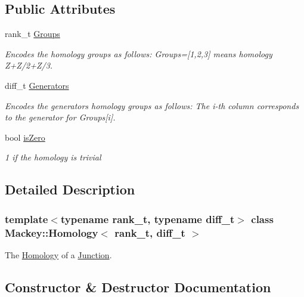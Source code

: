 \subsection*{Public Attributes}
\begin{DoxyCompactItemize}
\item 
rank\+\_\+t \hyperlink{classMackey_1_1Homology_aaae78e6463ce6e60e7f4c5861304bc5b}{Groups}
\begin{DoxyCompactList}\small\item\em Encodes the homology groups as follows\+: Groups=\mbox{[}1,2,3\mbox{]} means homology Z+\+Z/2+\+Z/3. \end{DoxyCompactList}\item 
diff\+\_\+t \hyperlink{classMackey_1_1Homology_afc375f3632f97e3fe3e24c06f1e18fa2}{Generators}
\begin{DoxyCompactList}\small\item\em Encodes the generators homology groups as follows\+: The i-\/th column corresponds to the generator for Groups\mbox{[}i\mbox{]}. \end{DoxyCompactList}\item 
bool \hyperlink{classMackey_1_1Homology_ae3bb3781bab2b5884295e04a8fddf36e}{is\+Zero}
\begin{DoxyCompactList}\small\item\em 1 if the homology is trivial \end{DoxyCompactList}\end{DoxyCompactItemize}


\subsection{Detailed Description}
\subsubsection*{template$<$typename rank\+\_\+t, typename diff\+\_\+t$>$\newline
class Mackey\+::\+Homology$<$ rank\+\_\+t, diff\+\_\+t $>$}

The \hyperlink{classMackey_1_1Homology}{Homology} of a \hyperlink{classMackey_1_1Junction}{Junction}. 

\subsection{Constructor \& Destructor Documentation}
\mbox{\label{classMackey_1_1Homology_a3580b194f986bd59a02fb84db97e00f2}} 
